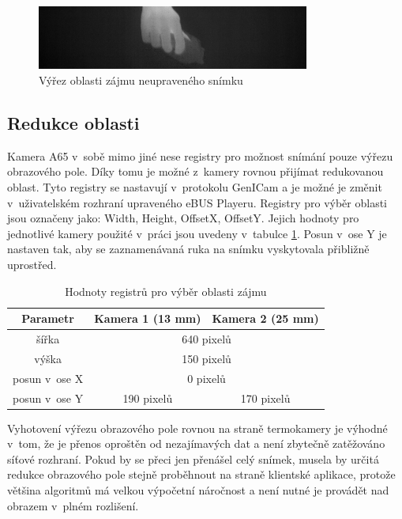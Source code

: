     \begin{figure}[h]
      \centering
      \includegraphics[width=0.8\textwidth]{images/camera_2_sample_image_small.jpg}
      \caption{Výřez oblasti zájmu neupraveného snímku}
      \label{fig:camera_2_sample_image_small}
    \end{figure}  

	\subsection{Redukce oblasti}\label{section:area_reduction}
    Kamera A65 v~sobě mimo jiné nese registry pro možnost snímání pouze výřezu obrazového pole. Díky tomu je možné z~kamery rovnou přijímat redukovanou oblast. Tyto registry se nastavují v~protokolu GenICam a je možné je změnit v~uživatelském rozhraní upraveného eBUS Playeru. Registry pro výběr oblasti jsou označeny jako: Width, Height, OffsetX, OffsetY. Jejich hodnoty pro jednotlivé kamery použité v~práci jsou uvedeny v~tabulce \ref{table:region_of_interest_settings}. Posun v~ose Y je nastaven tak, aby se zaznamenávaná ruka na snímku vyskytovala přibližně uprostřed.

    \begin{table}[h]
      \centering
      \begin{tabular}{|c|c|c|}
        \hline
        \rowcolor{Blue}
        \color{White}\textbf{Parametr} & \color{White}\textbf{Kamera 1 (13 mm)} & \color{White}\textbf{Kamera 2 (25 mm)}\\ \hline
        šířka & \multicolumn{2}{|c|}{640 pixelů}   \\ \hline
        výška & \multicolumn{2}{|c|}{150 pixelů}   \\ \hline
        posun v~ose X & \multicolumn{2}{|c|}{ 0 pixelů} \\ \hline
        posun v~ose Y & 190 pixelů & 170 pixelů \\ \hline
      \end{tabular}
      \caption{Hodnoty registrů pro výběr oblasti zájmu}
      \label{table:region_of_interest_settings}
    \end{table}
    
    Vyhotovení výřezu obrazového pole rovnou na straně termokamery je výhodné v~tom, že je přenos oproštěn od nezajímavých dat a není zbytečně zatěžováno síťové rozhraní. Pokud by se přeci jen přenášel celý snímek, musela by určitá redukce obrazového pole stejně proběhnout na straně klientské aplikace, protože většina algoritmů má velkou výpočetní náročnost a není nutné je provádět nad obrazem v~plném rozlišení.

